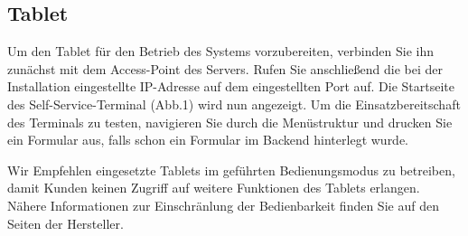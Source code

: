 \subsection{Tablet}

\noindent Um den Tablet für den Betrieb des Systems vorzubereiten, verbinden Sie ihn zunächst mit dem Access-Point des Servers. Rufen Sie anschließend die bei der Installation eingestellte IP-Adresse auf dem eingestellten Port auf. Die Startseite des Self-Service-Terminal (Abb.1) wird nun angezeigt. Um die Einsatzbereitschaft des Terminals zu testen, navigieren Sie durch die Menüstruktur und drucken Sie ein Formular aus, falls schon ein Formular im Backend hinterlegt wurde.\par
\noindent Wir Empfehlen eingesetzte Tablets im \glqq geführten Bedienungsmodus\grqq{} zu betreiben, damit Kunden keinen Zugriff auf weitere Funktionen des Tablets erlangen. Nähere Informationen zur Einschränlung der Bedienbarkeit finden Sie auf den Seiten der Hersteller.